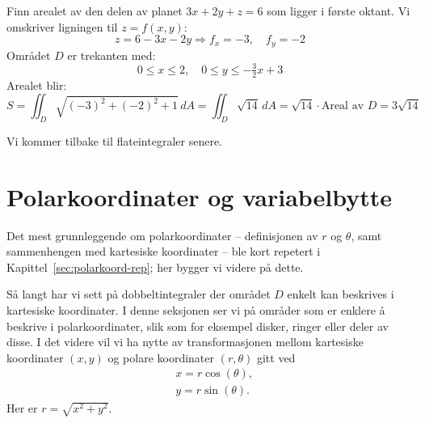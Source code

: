 \begin{eks}{}
Finn arealet av den delen av planet $3x + 2y + z = 6$ som ligger i første oktant. Vi omskriver ligningen til $z = f(x, y)$:
\[
z = 6 - 3x - 2y \Rightarrow f_x = -3, \quad f_y = -2
\]
Området $D$ er trekanten med:
\[
0 \leq x \leq 2, \quad 0 \leq y \leq -\tfrac{3}{2}x + 3
\]
Arealet blir:
\[
S = \iint_D \sqrt{(-3)^2 + (-2)^2 + 1}\, dA = \iint_D \sqrt{14}\, dA = \sqrt{14} \cdot \text{Areal av } D = 3\sqrt{14}
\]
\end{eks}

Vi kommer tilbake til flateintegraler senere.

\section{Polarkoordinater og variabelbytte}\label{sect:polarkoord}

Det mest grunnleggende om polarkoordinater -- definisjonen av $r$ og $\theta$, samt sammenhengen med kartesiske koordinater -- ble kort repetert i Kapittel~\hyperref[sec:polarkoord-rep]{\ref{sec:polarkoord-rep}}; her bygger vi videre på dette.

Så langt har vi sett på dobbeltintegraler der området \( D \) enkelt kan beskrives i kartesiske koordinater. I denne seksjonen ser vi på områder som er enklere å beskrive i polarkoordinater, slik som for eksempel disker, ringer eller deler av disse. I det videre vil vi ha nytte av transformasjonen mellom kartesiske koordinater $(x,y)$ og polare koordinater $(r,\theta)$ gitt ved
\begin{align}
    \label{polarTrans}
    &x=r\cos(\theta),\\
    &y=r\sin(\theta).
\end{align}
Her er $r=\sqrt{x^2+y^2}$.

